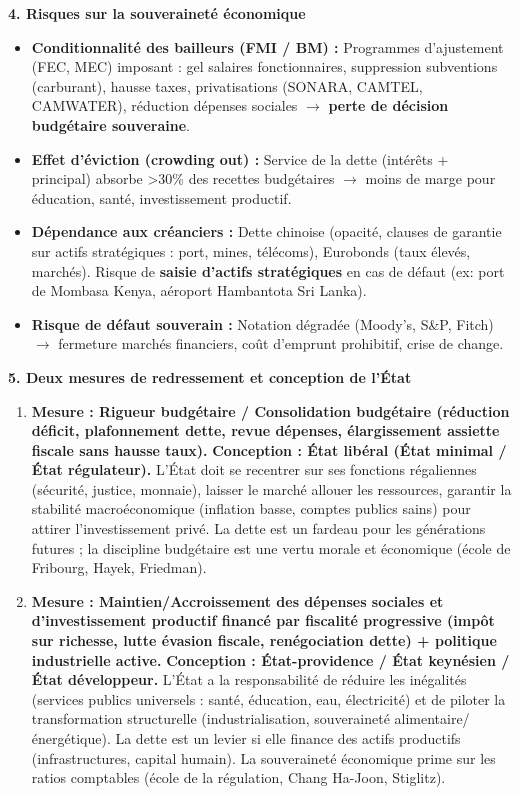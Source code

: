 \documentclass[11pt]{article}
\begin{document}
\begin{corrige}
\textbf{4. Risques sur la souveraineté économique}
\begin{itemize}
\item \textbf{Conditionnalité des bailleurs (FMI / BM) :} Programmes d'ajustement (FEC, MEC) imposant : gel salaires fonctionnaires, suppression subventions (carburant), hausse taxes, privatisations (SONARA, CAMTEL, CAMWATER), réduction dépenses sociales $\rightarrow$ \textbf{perte de décision budgétaire souveraine}.
\item \textbf{Effet d'éviction (crowding out) :} Service de la dette (intérêts + principal) absorbe \textgreater 30\% des recettes budgétaires $\rightarrow$ moins de marge pour éducation, santé, investissement productif.
\item \textbf{Dépendance aux créanciers :} Dette chinoise (opacité, clauses de garantie sur actifs stratégiques : port, mines, télécoms), Eurobonds (taux élevés, marchés). Risque de \textbf{saisie d'actifs stratégiques} en cas de défaut (ex: port de Mombasa Kenya, aéroport Hambantota Sri Lanka).
\item \textbf{Risque de défaut souverain :} Notation dégradée (Moody's, S\&P, Fitch) $\rightarrow$ fermeture marchés financiers, coût d'emprunt prohibitif, crise de change.
\end{itemize}

\textbf{5. Deux mesures de redressement et conception de l'État}
\begin{enumerate}
\item \textbf{Mesure : Rigueur budgétaire / Consolidation budgétaire (réduction déficit, plafonnement dette, revue dépenses, élargissement assiette fiscale sans hausse taux).}
\textbf{Conception : \textbf{État libéral (État minimal / État régulateur).}} L'État doit se recentrer sur ses fonctions régaliennes (sécurité, justice, monnaie), laisser le marché allouer les ressources, garantir la stabilité macroéconomique (inflation basse, comptes publics sains) pour attirer l'investissement privé. La dette est un fardeau pour les générations futures ; la discipline budgétaire est une vertu morale et économique (école de Fribourg, Hayek, Friedman).
\item \textbf{Mesure : Maintien/Accroissement des dépenses sociales et d'investissement productif financé par fiscalité progressive (impôt sur richesse, lutte évasion fiscale, renégociation dette) + politique industrielle active.}
\textbf{Conception : \textbf{État-providence / État keynésien / État développeur.}} L'État a la responsabilité de réduire les inégalités (services publics universels : santé, éducation, eau, électricité) et de piloter la transformation structurelle (industrialisation, souveraineté alimentaire/énergétique). La dette est un levier si elle finance des actifs productifs (infrastructures, capital humain). La souveraineté économique prime sur les ratios comptables (école de la régulation, Chang Ha-Joon, Stiglitz).
\end{enumerate}


\end{corrige}
\end{document}
